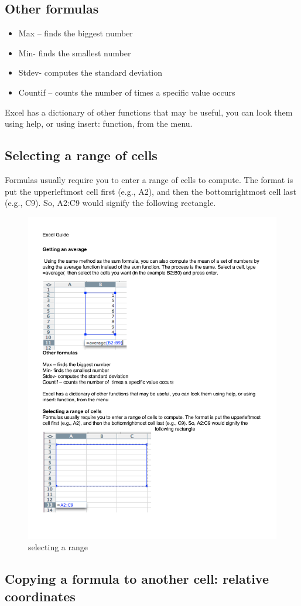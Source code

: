 \subsection{Other formulas}

\begin{itemize}
\item Max – finds the biggest number
\item Min- finds the smallest number
\item Stdev- computes the standard deviation
\item Countif – counts the number of times a specific value occurs
\end{itemize}

Excel has a dictionary of other functions that may be useful, you can look them using help, or using insert: function, from the menu.


\subsection{Selecting a range of cells}
Formulas usually require you to enter a range of cells to compute. The format is put the upperleftmost cell first (e.g., A2), and then the bottomrightmost cell last (e.g., C9). So, A2:C9 would signify the
following rectangle.

\begin{figure}
      \includegraphics[width=.5\linewidth]{LabmanualFigures/Excel9.pdf}
      \caption{selecting a range}
      \label{fig:excel9}
\end{figure}
  

\subsection{Copying a formula to another cell: relative coordinates}

